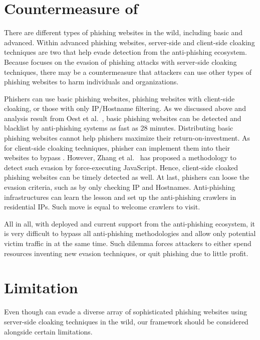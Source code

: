 \section{Countermeasure of \spartacus}


There are different types of phishing websites in the wild, including basic and advanced.
Within advanced phishing websites, server-side and client-side cloaking techniques are two that help evade detection from the anti-phishing ecosystem.
Because \spartacus focuses on the evasion of phishing attacks with server-side cloaking techniques,
there may be a countermeasure that attackers can use other types of phishing websites to harm individuals and organizations.

Phishers can use basic phishing websites, phishing websites with client-side cloaking, or those with only IP/Hostname filtering.
As we discussed above and analysis result from Oest et al.~\cite{oest2020phishtime}, basic phishing websites can be detected and blacklist by anti-phishing systems as fast as 28 minutes.
Distributing basic phishing websites cannot help phishers maximize their return-on-investment.
As for client-side cloaking techniques,
phisher can implement them into their websites to bypass \spartacus.
However, Zhang et al.~\cite{zhang2021crawlphish} has proposed a methodology to detect such evasion by force-executing JavaScript.
Hence, client-side cloaked phishing websites can be timely detected as well.
At last, phishers can loose the evasion criteria, such as by only checking IP and Hostnames.
Anti-phishing infrastructures can learn the lesson and set up the anti-phishing crawlers in residential IPs.
Such move is equal to welcome crawlers to visit.

All in all, with \spartacus deployed and current support from the anti-phishing ecosystem, 
it is very difficult to bypass all anti-phishing methodologies and allow only potential victim traffic in at the same time.
Such dilemma forces attackers to either spend resources inventing new evasion techniques, or quit phishing due to little profit.


\section{Limitation}

Even though \spartacus can evade a diverse array of sophisticated phishing websites using server-side cloaking techniques in the wild,
our framework should be considered alongside certain limitations.


